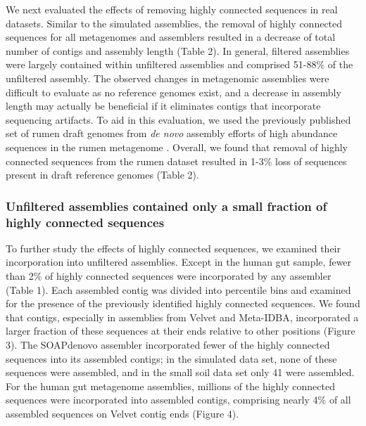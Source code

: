 \documentclass[10pt]{article}
\begin{document}
We next evaluated the effects of removing highly connected sequences in
real datasets.  Similar to the simulated assemblies, the
removal of highly connected sequences for all metagenomes and
assemblers resulted in a decrease of total number of contigs and assembly
length (Table 2).  In general, filtered assemblies were largely
contained within unfiltered assemblies and comprised 51-88\% of the
unfiltered assembly.  The observed changes in metagenomic assemblies
were difficult to evaluate as no reference genomes exist, 
and a decrease in assembly length may actually be beneficial if it
eliminates contigs that incorporate sequencing artifacts.
To aid in this evaluation, we used the previously published set of
rumen draft genomes from \emph{de novo} assembly efforts of high
abundance sequences in the rumen metagenome \cite{Hess:2011p686}.
Overall, we found that removal of highly connected sequences from the
rumen dataset resulted in 1-3\% loss of sequences present in
draft reference genomes (Table 2).


\subsubsection*{Unfiltered assemblies contained only a small fraction of highly connected sequences}

To further study the effects of highly connected sequences, we
examined their incorporation into unfiltered assemblies.  Except in
the human gut sample, fewer than 2\% of highly connected sequences
were incorporated by any assembler (Table 1).  Each assembled
contig was divided into percentile bins and examined for the
presence of the previously identified highly connected sequences.  We
found that contigs, especially in assemblies from Velvet and
Meta-IDBA, incorporated a larger fraction of these sequences at their
ends relative to other positions (Figure 3).  The SOAPdenovo
assembler incorporated fewer of the highly connected sequences into
its assembled contigs; in the simulated data set, none of these sequences
were assembled, and in the small soil data set only 41 were assembled.  For
the human gut metagenome assemblies, millions of the highly connected
sequences were incorporated into assembled contigs, comprising nearly
4\% of all assembled sequences on Velvet contig ends (Figure 4).
\end{document}
